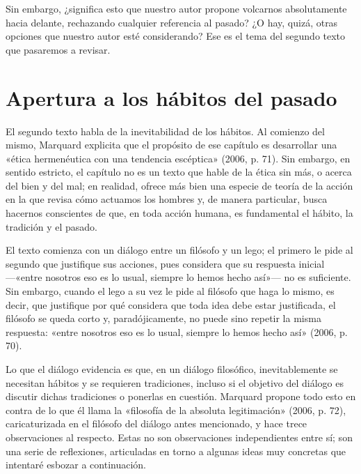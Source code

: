 \begin{refsection}
Sin embargo, ¿significa esto que nuestro autor propone volcarnos absolutamente hacia delante, rechazando cualquier referencia al pasado? ¿O hay, quizá, otras opciones que nuestro autor esté considerando? Ese es el tema del segundo texto que pasaremos a revisar.

\section{Apertura a los hábitos del pasado}

El segundo texto habla de la inevitabilidad de los hábitos. Al comienzo del mismo, Marquard explicita que el propósito de ese capítulo es desarrollar una «ética hermenéutica con una tendencia escéptica» (2006, p. 71). Sin embargo, en sentido estricto, el capítulo no es un texto que hable de la ética sin más, o acerca del bien y del mal; en realidad, ofrece más bien una especie de teoría de la acción en la que revisa cómo actuamos los hombres y, de manera particular, busca hacernos conscientes de que, en toda acción humana, es fundamental el hábito, la tradición y el pasado.

El texto comienza con un diálogo entre un filósofo y un lego; el primero le pide al segundo que justifique sus acciones, pues considera que su respuesta inicial ---«entre nosotros eso es lo usual, siempre lo hemos hecho así»--- no es suficiente. Sin embargo, cuando el lego a su vez le pide al filósofo que haga lo mismo, es decir, que justifique por qué considera que toda idea debe estar justificada, el filósofo se queda corto y, paradójicamente, no puede sino repetir la misma respuesta: «entre nosotros eso es lo usual, siempre lo hemos hecho así» (2006, p. 70).

Lo que el diálogo evidencia es que, en un diálogo filosófico, inevitablemente se necesitan hábitos y se requieren tradiciones, incluso si el objetivo del diálogo es discutir dichas tradiciones o ponerlas en cuestión. Marquard propone todo esto en contra de lo que él llama la «filosofía de la absoluta legitimación» (2006, p. 72), caricaturizada en el filósofo del diálogo antes mencionado, y hace trece observaciones al respecto. Estas no son observaciones independientes entre sí; son una serie de reflexiones, articuladas en torno a algunas ideas muy concretas que intentaré esbozar a continuación.


\end{refsection}
